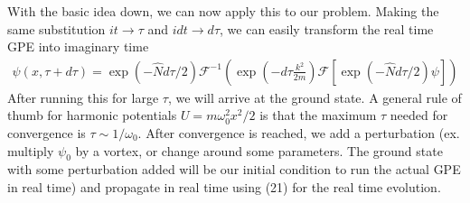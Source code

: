 \documentclass{article}
\begin{document}
With the basic idea down, we can now apply this to our problem. Making the same substitution $it\to\tau$ and 
$idt\to d\tau$, we can easily transform the real time GPE into imaginary time
\begin{align}
    \psi(x,\tau+d\tau)=\exp(-\hat{N}d\tau/2)\mathcal{F}^{-1}(\exp(-d\tau\frac{k^2}{2m})\mathcal{F}[\exp(-\hat{N}d\tau/2)\psi])
\end{align}
After running this for large $\tau$, we will arrive at the ground state. A general rule of thumb for 
harmonic potentials $U=m\omega_0^2x^2/2$ is that the maximum $\tau$ needed for convergence 
is $\tau\sim1/\omega_0$. After convergence is reached, we add a perturbation 
(ex. multiply $\psi_0$ by a vortex, or change around some
 parameters. The ground state with some perturbation added will be 
our initial condition to run the actual GPE in real time) and propagate in real time 
using (21) for the real time evolution.
\end{document}
